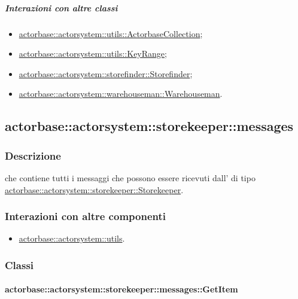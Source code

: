 \documentclass{scalatekids-article}
\begin{document}
\subparagraph{Interazioni con altre classi}
\begin{itemize}
\item \hyperref[sec:actorbase::actorsystem::utils::ActorbaseCollection]{actorbase::actorsystem::utils::ActorbaseCollection};
\item \hyperref[sec:actorbase::actorsystem::utils::KeyRange]{actorbase::actorsystem::utils::KeyRange};
\item \hyperref[sec:actorbase::actorsystem::storefinder::Storefinder]{actorbase::actorsystem::storefinder::Storefinder};
\item \hyperref[sec:actorbase::actorsystem::warehouseman::Warehouseman]{actorbase::actorsystem::warehouseman::Warehouseman}.
\end{itemize}

\subsection{actorbase::actorsystem::storekeeper::messages}
\label{sec:actorbase::actorsystem::storekeeper::messages}

\subsubsection{Descrizione}

 che contiene tutti i messaggi che possono essere
ricevuti dall' di tipo
\hyperref[sec:actorbase::actorsystem::storekeeper::Storekeeper]{actorbase::\allowbreak{}actorsystem::\allowbreak{}storekeeper::\allowbreak{}Storekeeper}.

\subsubsection{Interazioni con altre componenti}
\begin{itemize}
\item \hyperref[sec:actorbase::actorsystem::utils]{actorbase::actorsystem::utils}.
\end{itemize}

\subsubsection{Classi}

\paragraph{actorbase::actorsystem::storekeeper::messages::GetItem}
\label{sec:actorbase::actorsystem::storekeeper::messages::GetItem}
\end{document}
